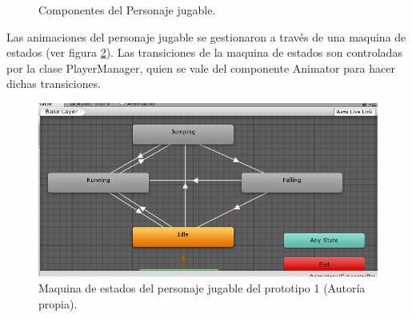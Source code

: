 \begin{figure}
  \centering
   
 	
  \caption{Componentes del Personaje jugable.}
  \label{figPersonajeJuCom}
\end{figure} 

Las animaciones del personaje jugable se gestionaron a través de una maquina de 
estados (ver figura \ref{figMaqEsCat}). Las transiciones de la maquina de 
estados son controladas por la clase PlayerManager, quien se vale del componente 
Animator para hacer dichas transiciones.

\begin{figure}
  \centering
   \includegraphics[width=0.6 \textwidth]{05TrabajoRealizado/03Unity/imagenes/02AnimacionGato}
  \caption{Maquina de estados del personaje jugable del prototipo 1 (Autoría propia).}
  \label{figMaqEsCat}
\end{figure} 

